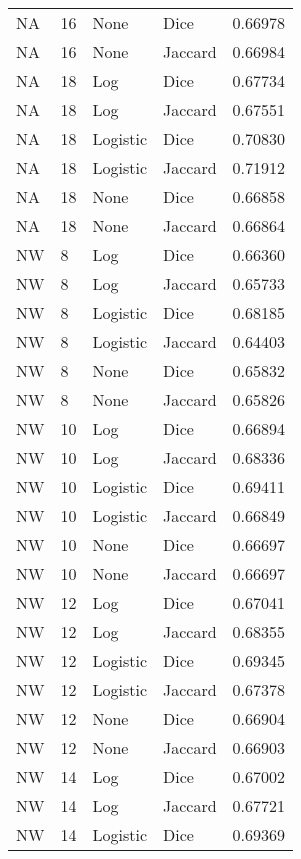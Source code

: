 \documentclass{article}
\begin{document}
\begin{center}
\begin{supertabular}{| l | l | l | l | l |}
               NA & 16 & None & Dice & 0.66978 \\
               NA & 16 & None & Jaccard & 0.66984 \\
               NA & 18 & Log & Dice & 0.67734 \\
               NA & 18 & Log & Jaccard & 0.67551 \\
               NA & 18 & Logistic & Dice & 0.70830 \\
               NA & 18 & Logistic & Jaccard & 0.71912 \\
               NA & 18 & None & Dice & 0.66858 \\
               NA & 18 & None & Jaccard & 0.66864 \\
               NW & 8 & Log & Dice & 0.66360 \\
               NW & 8 & Log & Jaccard & 0.65733 \\
               NW & 8 & Logistic & Dice & 0.68185 \\
               NW & 8 & Logistic & Jaccard & 0.64403 \\
               NW & 8 & None & Dice & 0.65832 \\
               NW & 8 & None & Jaccard & 0.65826 \\
               NW & 10 & Log & Dice & 0.66894 \\
               NW & 10 & Log & Jaccard & 0.68336 \\
               NW & 10 & Logistic & Dice & 0.69411 \\
               NW & 10 & Logistic & Jaccard & 0.66849 \\
               NW & 10 & None & Dice & 0.66697 \\
               NW & 10 & None & Jaccard & 0.66697 \\
               NW & 12 & Log & Dice & 0.67041 \\
               NW & 12 & Log & Jaccard & 0.68355 \\
               NW & 12 & Logistic & Dice & 0.69345 \\
               NW & 12 & Logistic & Jaccard & 0.67378 \\
               NW & 12 & None & Dice & 0.66904 \\
               NW & 12 & None & Jaccard & 0.66903 \\
               NW & 14 & Log & Dice & 0.67002 \\
               NW & 14 & Log & Jaccard & 0.67721 \\
               NW & 14 & Logistic & Dice & 0.69369 \\

\end{supertabular}
\end{center}
\end{document}
